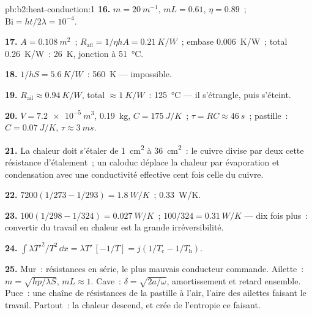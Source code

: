 \begin{solution}{pb:b2:heat-conduction:1}
\textbf{16.} $m = \qty{20}{m^{-1}}$, $mL = 0.61$, $\eta = 0.89$~; $\mathrm{Bi} = ht/2\lambda
= 10^{-4}$.

\textbf{17.} $A = \qty{0.108}{m^2}$~; $R_{\text{ail}} = 1/\eta hA = \qty{0.21}{K/W}$~; embase
\qty{0.006}{K/W}~; total \qty{0.26}{K/W}~: \qty{26}{K}, jonction à \qty{51}{\celsius}.

\textbf{18.} $1/hS = \qty{5.6}{K/W}$~: \qty{560}{K} --- impossible.

\textbf{19.} $R_{\text{ail}} \approx \qty{0.94}{K/W}$, total $\approx \qty{1}{K/W}$~:
\qty{125}{\celsius} --- il s'étrangle, puis s'éteint.

\textbf{20.} $V = \qty{7.2e-5}{m^3}$, \qty{0.19}{kg}, $C = \qty{175}{J/K}$~; $\tau = RC
\approx \qty{46}{s}$~; pastille~: $C = \qty{0.07}{J/K}$, $\tau \approx \qty{3}{ms}$.

\textbf{21.} La chaleur doit s'étaler de \qty{1}{cm^2} à \qty{36}{cm^2}~: le cuivre
divise par deux cette résistance d'étalement~; un caloduc déplace la chaleur par
évaporation et condensation avec une conductivité effective cent
fois celle du cuivre.

\textbf{22.} $7200(1/273 - 1/293) = \qty{1.8}{W/K}$~; \qty{0.33}{W/K}.

\textbf{23.} $100(1/298 - 1/324) = \qty{0.027}{W/K}$~; $100/324 = \qty{0.31}{W/K}$ ---
dix fois plus~: convertir du travail en chaleur est la grande irréversibilité.

\textbf{24.} $\int\lambda T'^2/T^2\,\dd x = \lambda T'\,[-1/T] = j(1/T_{\text{c}} -
1/T_{\text{h}})$.

\textbf{25.} Mur~: résistances en série, le plus mauvais conducteur commande.
Ailette~: $m = \sqrt{hp/\lambda S}$, $mL \approx 1$. Cave~: $\delta = \sqrt{2a/\omega}$,
amortissement et retard ensemble. Puce~: une chaîne de résistances de la pastille à
l'air, l'aire des ailettes faisant le travail. Partout~: la chaleur descend, et
crée de l'entropie ce faisant.
\end{solution}
